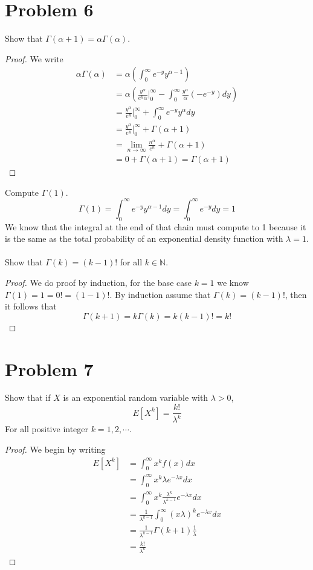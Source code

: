 \documentclass{article}
\begin{document}
\section*{Problem 6}
    Show that $\Gamma(\alpha + 1) = \alpha \Gamma(\alpha)$.
    \begin{proof}
        We write
        \begin{align*}
            \alpha \Gamma(\alpha) &= \alpha\left(
                \int_0^\infty e^{-y} y^{\alpha - 1}
            \right)\\
            &= \alpha\left(
                \frac{y^\alpha}{e^y \alpha}\bigg|_0^\infty - \int_0^\infty \frac{y^\alpha}{\alpha}(-e^{-y})dy
            \right)\\
            &= \frac{y^\alpha}{e^y}\bigg|_0^\infty + \int_0^\infty e^{-y}{y^\alpha}dy\\
            &= \frac{y^\alpha}{e^y}\bigg|_0^\infty + \Gamma(\alpha + 1)\\
            &= \lim_{n \rightarrow \infty} \frac{n^\alpha}{e^n} + \Gamma(\alpha + 1)\\
            &= 0 + \Gamma(\alpha + 1) = \Gamma(\alpha + 1)
        \end{align*}
    \end{proof}
    Compute $\Gamma(1)$.
    \[
        \Gamma(1) = \int_0^\infty e^{-y}y^{\alpha - 1}dy = \int_0^\infty e^{-y}dy = 1
    \]
    We know that the integral at the end of that chain must compute to 1 because it is
    the same as the total probability of an exponential density function with $\lambda = 1$.\\\\
    Show that $\Gamma(k) = (k-1)!$ for all $k \in \mathbb{N}$.
    \begin{proof}
        We do proof by induction, for the base case $k = 1$ we know $\Gamma(1) = 1 = 0! = (1 - 1)!$.
        By induction assume that $\Gamma(k) = (k-1)!$, then it follows that
        \[\Gamma(k+1) = k\Gamma(k) = k(k-1)! = k!\]
    \end{proof}

\section*{Problem 7}
    Show that if $X$ is an exponential random variable with $\lambda > 0$,
    \[
        E[X^k] = \frac{k!}{\lambda^k}
    \]
    For all positive integer $k = 1,2,\cdots$.
    \begin{proof}
        We begin by writing
        \begin{align*}
            E[X^k] &= \int_0^\infty x^k f(x) dx\\
            &= \int_0^\infty x^k \lambda e^{-\lambda x} dx\\
            &= \int_0^\infty x^k \frac{\lambda^k}{\lambda^{k-1}} e^{-\lambda x} dx\\
            &= \frac{1}{\lambda^{k-1}} \int_0^\infty (x\lambda)^k e^{-\lambda x} dx\\
            &= \frac{1}{\lambda^{k-1}} \Gamma(k+1) \frac{1}{\lambda}\\
            &= \frac{k!}{\lambda^{k}}
        \end{align*}
    \end{proof}
\end{document}
